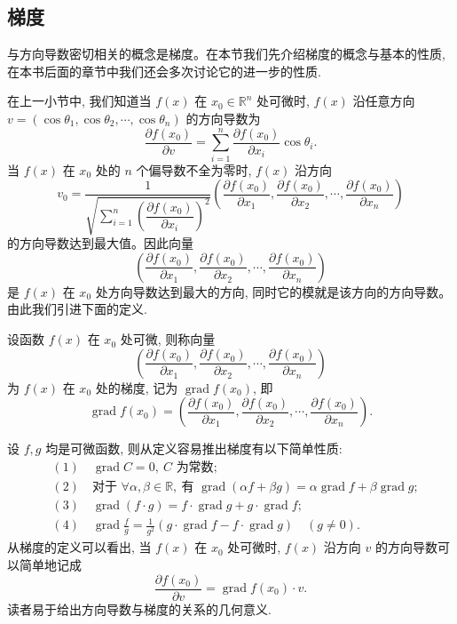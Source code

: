 \subsection{梯度}
\label{subsec:ma-14-1-4}

与方向导数密切相关的概念是梯度。在本节我们先介绍梯度的概念与基本的性质, 在本书后面的章节中我们还会多次讨论它的进一步的性质.

在上一小节中, 我们知道当 $f(x)$ 在 $x_0\in\mathbb R^n$ 处可微时, $f(x)$ 沿任意方向 $v=(\cos\theta_1,\cos\theta_2,\cdots,\cos\theta_n)$ 的方向导数为
\[
  \frac{\partial f(x_0)}{\partial v}=
  \sum_{i=1}^n\frac{\partial f(x_0)}{\partial x_i}\cos\theta_i.
\]
当 $f(x)$ 在 $x_0$ 处的 $n$ 个偏导数不全为零时, $f(x)$ 沿方向
\[
  v_0=
  \frac1{\sqrt{\sum\limits_{i=1}^n\left(\dfrac{\partial f(x_0)}{\partial x_i}\right)^2}}
  \left(\frac{\partial f(x_0)}{\partial x_1},\frac{\partial f(x_0)}{\partial x_2},\cdots,\frac{\partial f(x_0)}{\partial x_n}\right)
\]
的方向导数达到最大值。因此向量
\[
  \left(\frac{\partial f(x_0)}{\partial x_1},\frac{\partial f(x_0)}{\partial x_2},\cdots,\frac{\partial f(x_0)}{\partial x_n}\right)
\]
是 $f(x)$ 在 $x_0$ 处方向导数达到最大的方向, 同时它的模就是该方向的方向导数。由此我们引进下面的定义.

\begin{definition}\label{definition:ma-14-1-4}
设函数 $f(x)$ 在 $x_0$ 处可微, 则称向量
\[
  \left(\frac{\partial f(x_0)}{\partial x_1},\frac{\partial f(x_0)}{\partial x_2},\cdots,\frac{\partial f(x_0)}{\partial x_n}\right)
\]
为 $f(x)$ 在 $x_0$ 处的梯度, 记为 $\operatorname{grad}f(x_0)$, 即
\[
  \operatorname{grad}f(x_0)=
  \left(\frac{\partial f(x_0)}{\partial x_1},\frac{\partial f(x_0)}{\partial x_2},\cdots,\frac{\partial f(x_0)}{\partial x_n}\right).
\]
\end{definition}

设 $f,g$ 均是可微函数, 则从定义容易推出梯度有以下简单性质:
\[
\begin{aligned}
  &(1)\quad \operatorname{grad}C=0,\ C\text{ 为常数};\\
  &(2)\quad \text{对于 } \forall\alpha,\beta\in\mathbb R,\ \text{有 }
  \operatorname{grad}(\alpha f+\beta g)=\alpha\operatorname{grad}f+\beta\operatorname{grad}g;\\
  &(3)\quad \operatorname{grad}(f\cdot g)=f\cdot\operatorname{grad}g+g\cdot\operatorname{grad}f;\\
  &(4)\quad \operatorname{grad}\frac fg=\frac1{g^2}(g\cdot\operatorname{grad}f-f\cdot\operatorname{grad}g)\quad(g\ne0).
\end{aligned}
\]
从梯度的定义可以看出, 当 $f(x)$ 在 $x_0$ 处可微时, $f(x)$ 沿方向 $v$ 的方向导数可以简单地记成
\[
  \frac{\partial f(x_0)}{\partial v}=\operatorname{grad}f(x_0)\cdot v.
\]
读者易于给出方向导数与梯度的关系的几何意义.

